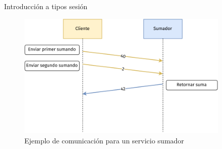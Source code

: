 \begin{frame}{Introducción a tipos sesión}
	\begin{figure}
		\centering
		\includegraphics[width=0.9\textwidth]{images/sum-diagram.pdf}
		\caption{Ejemplo de comunicación para un servicio sumador}
	\end{figure}
\end{frame}
